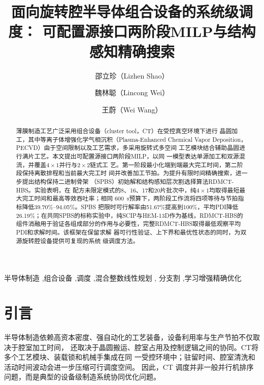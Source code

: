 \documentclass[final,5p,times,twocolumn]{elsarticle}
\begin{document}
\begin{frontmatter}

\title{面向旋转腔半导体组合设备的系统级调度：
可配置源接口两阶段MILP与结构感知精确搜索}

\author[ustb]{邵立珍（Lizhen Shao）}
\author[ustb]{魏林聪（Lincong Wei）}
\author[ustb]{王蔚（Wei Wang）}

\address[ustb]{北京科技大学控制科学与工程系，北京市海淀区学院路30号，
北京100083，中国}

\begin{abstract}
薄膜制造工艺广泛采用组合设备（cluster tool，CT）在受控真空环境下进行
晶圆加工，其中等离子体增强化学气相沉积（Plasma-Enhanced Chemical Vapor 
Deposition，PECVD）由于空间限制以及工艺需求，多采用旋转式多空间
工艺模块结合辅助晶圆进行满片工艺。本文提出可配置源接口两阶段MILP，以同
一模型表达单源加工和双源混流，并覆盖$4\times1$并行与$2\times2$链式工
艺。第一阶段最小化端到端最大完工时间，第二阶段保持离散排程和当前最大完工时
间并改善加工节拍。为提升有限时间精确搜索，进一步提出结构保持二进制骨架
（SPBS）初始解和结构感知层次割选择算法RDMCT-HBS。实验表明，在
配方未限定模式的8、16、17和20片批次中，纯$4\times1$均取得最短最大完工时间和最高等效吞吐率；相同
600~s预算下，两阶段工作流将四项等待与节拍指标降低39.70\%--94.05\%。SPBS
把限时可行解率由51.67\%提高到100\%，平均PDI降低26.19\%；在共同SPBS的标称实验中，纯SCIP与HEM-13D作为基线，RDMCT-HBS的组件消融用于验证各组成部分的作用与必要性，完整RDMCT-HBS取得最低观察平均PDI和求解时间。该框架在保留求解
器可行性验证、上下界和最优性状态的同时，为双源旋转腔设备提供可复现的系统
级调度方法。
\end{abstract}

\begin{keyword}
半导体制造 \sep 组合设备 \sep 调度 \sep 混合整数线性规划 \sep
分支割 \sep 学习增强精确优化
\end{keyword}

\end{frontmatter}
\section{引言}

半导体制造依赖高资本密度、强自动化的工艺装备，设备利用率与生产节拍不仅取决于腔室加工时间，
还取决于晶圆搬运、腔室占用及控制逻辑之间的协同。CT将多个工艺模块、装载锁和机械手集成在同
一受控环境中；驻留时间、腔室清洗和活动时间波动会进一步压缩可行调度空间\citep{pan2018survey}。
因此，CT 调度并非一般并行机排序问题，而是典型的设备级制造系统协同优化问题。
\end{document}

